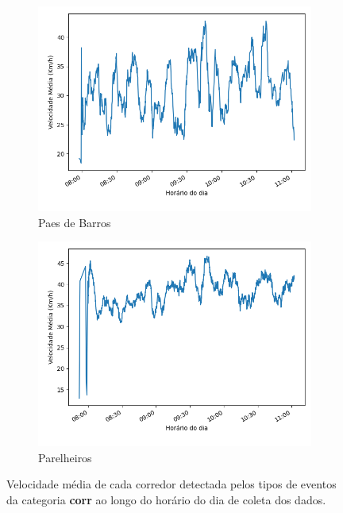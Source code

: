 \begin{figure}
\begin{subfigure}{.5\textwidth}
  \centering
  \includegraphics[width=\textwidth]{figuras/detect_graphics/avg_speed_7-dez-su-corr_PaesDeBarros.png}
  \caption{Paes de Barros}
  \label{fig::avg_speed_Paes_de_Barros}
\end{subfigure}%
\begin{subfigure}{.5\textwidth}
  \centering
  \includegraphics[width=\textwidth]{figuras/detect_graphics/avg_speed_7-dez-su-corr_Parelheiros.png}
  \caption{Parelheiros}
  \label{fig::avg_speed_Parelheiros}
\end{subfigure}
 \caption{Velocidade média de cada corredor detectada pelos tipos de eventos da categoria \textbf{corr} ao longo do horário do dia de coleta dos dados.}
\label{fig:all_avg_speed_corr}
\end{figure}





